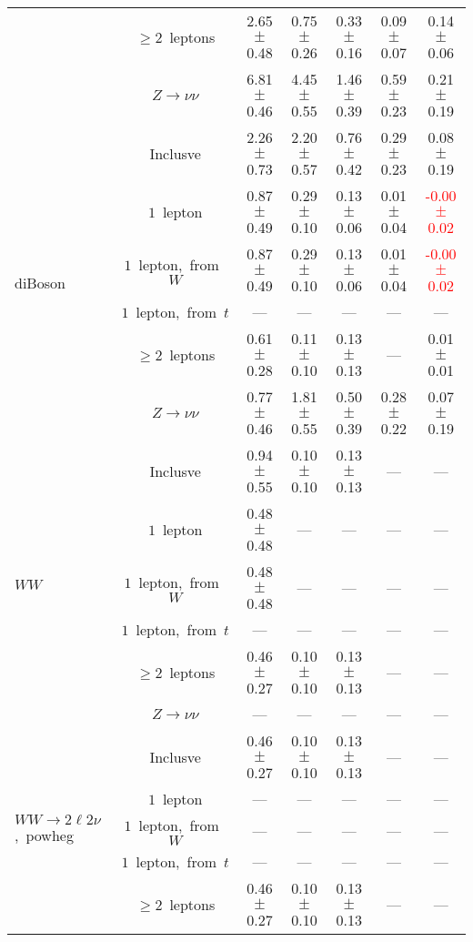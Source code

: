 \documentclass{article}
\begin{document}
\begin{longtable}{|l|c|c|c|c|c|c|}
 & $\ge2$~leptons  & 2.65 $\pm$ 0.48  & 0.75 $\pm$ 0.26  & 0.33 $\pm$ 0.16  & 0.09 $\pm$ 0.07  & 0.14 $\pm$ 0.06 \\* 
 & $Z\rightarrow\nu\nu$  & 6.81 $\pm$ 0.46  & 4.45 $\pm$ 0.55  & 1.46 $\pm$ 0.39  & 0.59 $\pm$ 0.23  & 0.21 $\pm$ 0.19 \\* 
\hline 
\multirow{6}{*}{diBoson} & Inclusve  & 2.26 $\pm$ 0.73  & 2.20 $\pm$ 0.57  & 0.76 $\pm$ 0.42  & 0.29 $\pm$ 0.23  & 0.08 $\pm$ 0.19 \\* 
 & $1$~lepton  & 0.87 $\pm$ 0.49  & 0.29 $\pm$ 0.10  & 0.13 $\pm$ 0.06  & 0.01 $\pm$ 0.04  & \textcolor{red}{ -0.00 $\pm$ 0.02 } \\* 
 & $1$~lepton,~from~$W$  & 0.87 $\pm$ 0.49  & 0.29 $\pm$ 0.10  & 0.13 $\pm$ 0.06  & 0.01 $\pm$ 0.04  & \textcolor{red}{ -0.00 $\pm$ 0.02 } \\* 
 & $1$~lepton,~from~$t$  & ---  & ---  & ---  & ---  & --- \\* 
 & $\ge2$~leptons  & 0.61 $\pm$ 0.28  & 0.11 $\pm$ 0.10  & 0.13 $\pm$ 0.13  & ---  & 0.01 $\pm$ 0.01 \\* 
 & $Z\rightarrow\nu\nu$  & 0.77 $\pm$ 0.46  & 1.81 $\pm$ 0.55  & 0.50 $\pm$ 0.39  & 0.28 $\pm$ 0.22  & 0.07 $\pm$ 0.19 \\* 
\hline 
\multirow{6}{*}{$WW$} & Inclusve  & 0.94 $\pm$ 0.55  & 0.10 $\pm$ 0.10  & 0.13 $\pm$ 0.13  & ---  & --- \\* 
 & $1$~lepton  & 0.48 $\pm$ 0.48  & ---  & ---  & ---  & --- \\* 
 & $1$~lepton,~from~$W$  & 0.48 $\pm$ 0.48  & ---  & ---  & ---  & --- \\* 
 & $1$~lepton,~from~$t$  & ---  & ---  & ---  & ---  & --- \\* 
 & $\ge2$~leptons  & 0.46 $\pm$ 0.27  & 0.10 $\pm$ 0.10  & 0.13 $\pm$ 0.13  & ---  & --- \\* 
 & $Z\rightarrow\nu\nu$  & ---  & ---  & ---  & ---  & --- \\* 
\hline 
\multirow{6}{*}{$WW{\rightarrow}2\ell2\nu$,~powheg} & Inclusve  & 0.46 $\pm$ 0.27  & 0.10 $\pm$ 0.10  & 0.13 $\pm$ 0.13  & ---  & --- \\* 
 & $1$~lepton  & ---  & ---  & ---  & ---  & --- \\* 
 & $1$~lepton,~from~$W$  & ---  & ---  & ---  & ---  & --- \\* 
 & $1$~lepton,~from~$t$  & ---  & ---  & ---  & ---  & --- \\* 
 & $\ge2$~leptons  & 0.46 $\pm$ 0.27  & 0.10 $\pm$ 0.10  & 0.13 $\pm$ 0.13  & ---  & --- \\* 

\end{longtable}
\end{document}
